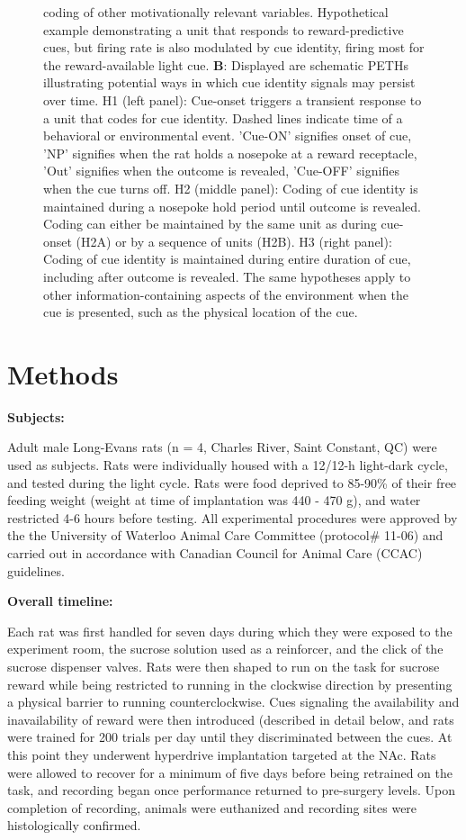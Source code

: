 \documentclass[11pt]{article}
\newcommand{\bsf}[1]{\textbf{#1}}
\begin{document}
\begin{figure}[h]
{  coding of other motivationally relevant variables. Hypothetical example
  demonstrating a unit that responds to reward-predictive cues, but firing rate
  is also modulated by cue identity, firing most for the reward-available light
  cue. \bsf{B}: Displayed are schematic PETHs illustrating potential ways in
  which cue identity signals may persist over time. H1 (left panel): Cue-onset
  triggers a transient response to a unit that codes for cue identity. Dashed
  lines indicate time of a behavioral or environmental event. 'Cue-ON' signifies
  onset of cue, 'NP' signifies when the rat holds a nosepoke at a reward
  receptacle, 'Out' signifies when the outcome is revealed, 'Cue-OFF' signifies
  when the cue turns off. H2 (middle panel): Coding of cue identity is
  maintained during a nosepoke hold period until outcome is revealed. Coding can
  either be maintained by the same unit as during cue-onset (H2A) or by a
  sequence of units (H2B). H3 (right panel): Coding of cue identity is
  maintained during entire duration of cue, including after outcome is
  revealed. The same hypotheses apply to other information-containing aspects of
  the environment when the cue is presented, such as the physical location of
  the cue.}
\label{fig:schematic}
\end{figure}

\section*{Methods}

{\bf Subjects:}

Adult male Long-Evans rats (n = 4, Charles River, Saint Constant, QC) were used
as subjects. Rats were individually housed with a 12/12-h light-dark cycle, and
tested during the light cycle. Rats were food deprived to 85-90\% of their free
feeding weight (weight at time of implantation was 440 - 470 g), and water
restricted 4-6 hours before testing. All experimental procedures were approved
by the the University of Waterloo Animal Care Committee (protocol\# 11-06) and
carried out in accordance with Canadian Council for Animal Care (CCAC)
guidelines.

{\bf Overall timeline:}

Each rat was first handled for seven days during which they were exposed to the
experiment room, the sucrose solution used as a reinforcer, and the click of the
sucrose dispenser valves. Rats were then shaped to run on the task for sucrose
reward while being restricted to running in the clockwise direction by
presenting a physical barrier to running counterclockwise. Cues signaling the
availability and inavailability of reward were then introduced (described in
detail below, and rats were trained for 200 trials per day until they
discriminated between the cues. At this point they underwent hyperdrive
implantation targeted at the NAc. Rats were allowed to recover for a minimum of
five days before being retrained on the task, and recording began once
performance returned to pre-surgery levels. Upon completion of recording,
animals were euthanized and recording sites were histologically confirmed.
\end{document}
